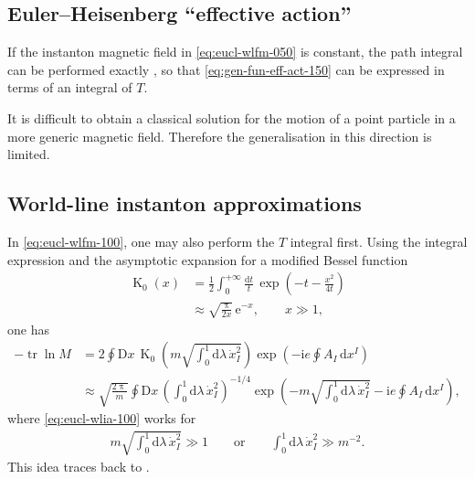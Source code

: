 \documentclass[12pt]{article}
\newcommand\mi{\mathrm{i}} %
\newcommand\me{\mathrm{e}} %
\newcommand\pp{\uppi}
\newcommand\dif{\mathrm{d}}
\newcommand\Dif{\mathrm{D}}
\DeclareMathOperator{\BesselK}{K}
\DeclareMathOperator{\tr}{tr}
\newcommand{\rbr}[1]{{\left(#1\right)}}
\newcommand{\rfun}[2]{{#1}\mathopen{}\left(#2\right)\mathclose{}}
\begin{document}
\subsection{Euler--Heisenberg ``effective action''}
\label{ssec:eucl-ehel}

If the instanton magnetic field in \cref{eq:eucl-wlfm-050} is constant, the 
path integral can be performed exactly \cite{Feynman1965}, so that 
\cref{eq:gen-fun-eff-act-150} can be expressed in terms of an integral of $T$.

It is difficult to obtain a classical solution for the motion of a point 
particle in a more generic magnetic field. %
Therefore the generalisation in this direction is limited.

\subsection{World-line instanton approximations}
\label{ssec:eucl-wlia}

In \cref{eq:eucl-wlfm-100}, one may also perform the $T$ integral first. Using 
the integral expression and the asymptotic expansion for a modified Bessel 
function
\begin{align}
\rfun{\BesselK_0}{x} &= \frac{1}{2} \int_0^{+\infty} \frac{\dif t}{t}\,
	\rfun{\exp}{-t-\frac{x^2}{4t}}
\\
&\approx \sqrt{\frac{\pp}{2x}}\,\me^{-x},\qquad
	x \gg 1,
\end{align}
one has
\begin{align}
- \tr\ln M &= 2 \oint \Dif x\,
	\rfun{\BesselK_0}{m\sqrt{\int_0^1 \dif\lambda\, \dot{x}_I^2}}
		\rfun{\exp}{- \mi e \oint A_I\,\dif x^I}
\\
&\approx \sqrt{\frac{2\pp}{m}} \oint \Dif x\,
	\rbr{\int_0^1 \dif\lambda\, \dot{x}_I^2}^{-1/4}
	\rfun{\exp}{-m\sqrt{\int_0^1 \dif\lambda\, \dot{x}_I^2}
		- \mi e \oint A_I\,\dif x^I},
\label{eq:eucl-wlia-100}
\end{align}
where \cref{eq:eucl-wlia-100} works for
\begin{align}
m \sqrt{\int_0^1 \dif\lambda\, \dot{x}_I^2} \gg 1
\qquad\text{or}\qquad
\int_0^1 \dif\lambda\, \dot{x}_I^2 \gg m^{-2}.
\end{align}
This idea traces back to \cite{Affleck1982}.
\end{document}
